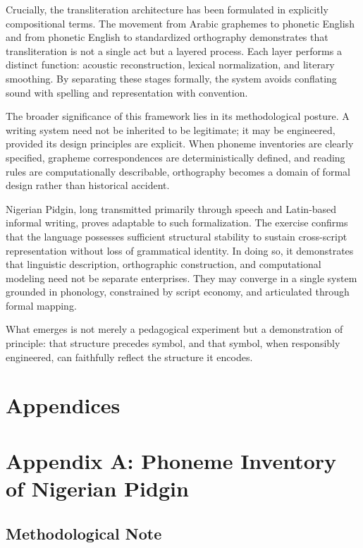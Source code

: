 \documentclass[12pt]{article}
\begin{document}
Crucially, the transliteration architecture has been formulated in explicitly compositional terms. The movement from Arabic graphemes to phonetic English and from phonetic English to standardized orthography demonstrates that transliteration is not a single act but a layered process. Each layer performs a distinct function: acoustic reconstruction, lexical normalization, and literary smoothing. By separating these stages formally, the system avoids conflating sound with spelling and representation with convention.

The broader significance of this framework lies in its methodological posture. A writing system need not be inherited to be legitimate; it may be engineered, provided its design principles are explicit. When phoneme inventories are clearly specified, grapheme correspondences are deterministically defined, and reading rules are computationally describable, orthography becomes a domain of formal design rather than historical accident.

Nigerian Pidgin, long transmitted primarily through speech and Latin-based informal writing, proves adaptable to such formalization. The exercise confirms that the language possesses sufficient structural stability to sustain cross-script representation without loss of grammatical identity. In doing so, it demonstrates that linguistic description, orthographic construction, and computational modeling need not be separate enterprises. They may converge in a single system grounded in phonology, constrained by script economy, and articulated through formal mapping.

What emerges is not merely a pedagogical experiment but a demonstration of principle: that structure precedes symbol, and that symbol, when responsibly engineered, can faithfully reflect the structure it encodes.

\newpage
\section*{Appendices}

\appendix
\section{Appendix A: Phoneme Inventory of Nigerian Pidgin}

\subsection{Methodological Note}
\end{document}
